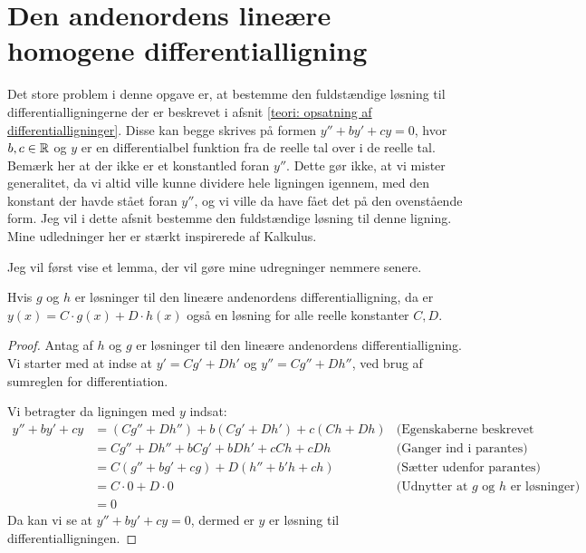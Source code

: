 \section{Den andenordens lineære homogene differentialligning}
Det store problem i denne opgave er, at bestemme den fuldstændige løsning til differentialligningerne der er beskrevet i afsnit \ref{teori: opsatning af differentialligninger}.
Disse kan begge skrives på formen $y'' + by' + cy = 0$, hvor $b,c \in \mathbb{R}$ og $y$ er en differentialbel funktion fra de reelle tal over i de reelle tal. 
Bemærk her at der ikke er et konstantled foran $y''$. 
Dette gør ikke, at vi mister generalitet, da vi altid ville kunne dividere hele ligningen igennem, med den konstant der havde stået foran $y''$, og vi ville da have fået det på den ovenstående form. 
Jeg vil i dette afsnit bestemme den fuldstændige løsning til denne ligning. 
Mine udledninger her er stærkt inspirerede af Kalkulus. 

Jeg vil først vise et lemma, der vil gøre mine udregninger nemmere senere.

\begin{lemma}\label{thm: Summen af to losninger er en losning}
Hvis $g$ og $h$ er løsninger til den lineære andenordens differentialligning, da er $y(x) = C\cdot g(x) + D \cdot h(x)$ også en løsning for alle reelle konstanter $C,D$. 
\end{lemma}

\begin{proof}
Antag af $h$ og $g$ er løsninger til den lineære andenordens differentialligning. 
Vi starter med at indse at $y'=Cg' + Dh'$ og $y'' = Cg'' + Dh''$, ved brug af sumreglen for differentiation. 

Vi betragter da ligningen med $y$ indsat:
\begin{align*}
y'' + by' + cy 	&= (Cg'' + Dh'') + b(Cg' + Dh') + c(Ch + Dh)	& \text{(Egenskaberne beskrevet ovenfor)}\\
				&= Cg'' + Dh'' + bCg' + bDh' + cCh + cDh		& \text{(Ganger ind i parantes)}\\
				&= C(g'' + bg' + cg) + D(h'' + b'h + ch)		& \text{(Sætter udenfor parantes)}\\
				&= C\cdot 0 + D \cdot 0							& \text{(Udnytter at $g$ og $h$ er løsninger)}\\
				&= 0 
\end{align*}
Da kan vi se at $y'' + by' + cy = 0$, dermed er $y$ er løsning til differentialligningen.
\end{proof}


